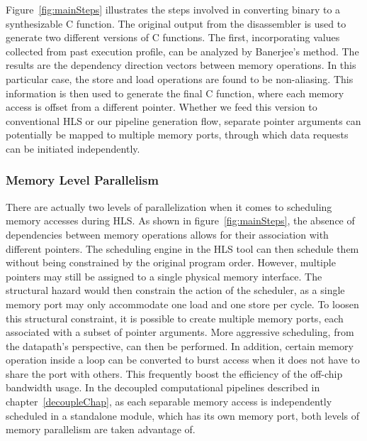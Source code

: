  
Figure~\ref{fig:mainSteps} illustrates the steps involved in converting binary to a synthesizable C function. 
The original output from the disassembler is used to generate two
different versions of C functions. The first, incorporating values collected from past execution profile, can be analyzed by Banerjee's method. The results are the dependency direction vectors between memory operations. In this particular case, the store and load operations are found to be non-aliasing. This information is then used to generate the final C function, where each memory access is offset from a different pointer. Whether we
feed this version to conventional HLS or our pipeline generation flow, separate pointer
arguments can potentially be mapped to multiple memory ports, through which data requests can be initiated
independently.


\subsubsection{Memory Level Parallelism}
\label{subsec:mlp}
There are actually two levels of parallelization when it comes to scheduling memory accesses during HLS. As shown in figure~\ref{fig:mainSteps}, the absence of dependencies between memory operations allows for their association with
different pointers. The scheduling engine in the HLS tool can then schedule
them without being constrained by the original program order. However, multiple pointers may still be assigned to a single physical memory interface. The structural hazard would then constrain the action of the scheduler,
as a single memory port may only accommodate one load and one store per cycle.
To loosen this structural constraint, it is possible to create multiple memory
ports, each associated with a subset of pointer arguments. More aggressive scheduling, from the datapath's perspective, can then be performed. In addition, certain memory operation inside a loop can be converted to burst
access when it does not have to share the port with others. This frequently boost the efficiency of the off-chip bandwidth usage. In the decoupled computational pipelines described in chapter~\ref{decoupleChap}, as each separable memory access is  independently scheduled in a standalone module, which has its own memory port, both levels of memory parallelism are taken advantage of.

